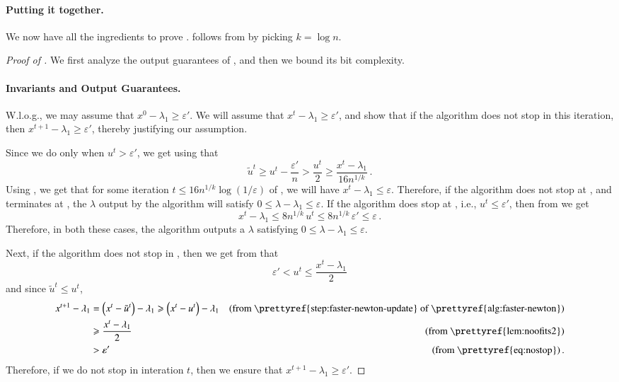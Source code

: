 \documentclass{article}[12pt]
\theoremstyle{definition}
\renewcommand{\leq}{\leqslant}
\renewcommand{\geq}{\geqslant}
\newcommand{\mper}{\,.}
\newcommand{\paren}[1]{\left(#1 \right )}
\newcommand{\e}{\epsilon}
\let\e\varepsilon
\newcommand{\ut}{u^t}
\newcommand{\tut}{\tilde{u}^t}
\newcommand{\eprime}{\e'}
\begin{document}
\paragraph{Putting it together.}
We now have all the ingredients to prove . 
follows from  by picking $k = \log n$.
\begin{proof}[Proof of ]
We first analyze the output guarantees of , and then we bound its bit complexity. 

\paragraph{Invariants and Output Guarantees.}
W.l.o.g., we may assume that $x^0 - \lambda_1 \geq \eprime$.
We will assume that $x^t - \lambda_1 \geq \eprime$, and show that if the algorithm does not
stop in this iteration, then $x^{t+1} - \lambda_1 \geq \eprime$, thereby justifying our assumption.

Since we do  only when $\ut > \eprime$, we get using  
that 
\[ \tut \geq \ut - \frac{\eprime}{n} > \frac{\ut}{2} \geq \frac{x^t - \lambda_1}{16 n^{1/k}} \mper \]
Using ,  we get that for some iteration 
$t \leq 16 n^{1/k} \log (1/\e)$ of , 
we will have $x^t - \lambda_1 \leq \e$.
Therefore, if the algorithm does not stop at , and 
terminates at , the $\lambda$ output by the algorithm
will satisfy $0 \leq \lambda - \lambda_1 \leq \e$.
If the algorithm does stop at , i.e., 
$\ut \leq \eprime$, then from  we get
\[ x^t - \lambda_1 \leq 8 n^{1/k}\, \ut \leq 8 n^{1/k}\, \eprime  \leq \e \mper  \]
Therefore, in both these cases, the algorithm outputs a $\lambda$ satisfying 
$0 \leq \lambda - \lambda_1 \leq \e$.

Next, if the algorithm does not stop in , then we get from
 that  
\begin{equation}
\label{eq:nostop}
 \eprime <  \ut \leq \frac{x^t - \lambda_1}{2} 
\end{equation}
and since $\tut \leq \ut$,  
\begin{align*}
x^{t+1} - \lambda_1 & = \paren{x^t - \tut} - \lambda_1 \geq \paren{x^t - \ut} - \lambda_1 
				& \textrm{(from \prettyref{step:faster-newton-update} of 
			\prettyref{alg:faster-newton})} \\
 & \geq  \frac{x^t - \lambda_1}{2} & \textrm{(from \prettyref{lem:noofits2})} \\            
 & > \eprime   & \textrm{(from \prettyref{eq:nostop})}\mper
\end{align*}
Therefore, if we do not stop in interation $t$, then we ensure that  
$ x^{t+1} - \lambda_1 \geq \eprime$.


\end{proof}
\end{document}
